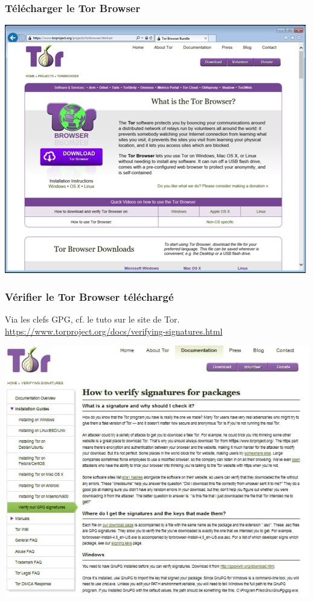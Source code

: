 \documentclass{beamer}
\begin{document}
\begin{frame}
\frametitle{Télécharger le Tor Browser}
\begin{center}
\includegraphics[scale=0.5]{./images/tor2.jpg}
\end{center}
\end{frame}

\begin{frame}
\frametitle{Vérifier le Tor Browser téléchargé}
Via les clefs GPG, cf. le tuto sur le site de Tor. \\ \url{https://www.torproject.org/docs/verifying-signatures.html}
\begin{center}
\includegraphics[scale=0.6]{./images/VerifyingSignatures.jpg}
\end{center}
\end{frame}
\end{document}
